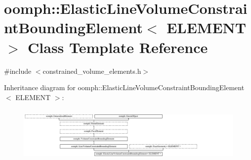 \hypertarget{classoomph_1_1ElasticLineVolumeConstraintBoundingElement}{}\section{oomph\+:\+:Elastic\+Line\+Volume\+Constraint\+Bounding\+Element$<$ E\+L\+E\+M\+E\+NT $>$ Class Template Reference}
\label{classoomph_1_1ElasticLineVolumeConstraintBoundingElement}


{\ttfamily \#include $<$constrained\+\_\+volume\+\_\+elements.\+h$>$}

Inheritance diagram for oomph\+:\+:Elastic\+Line\+Volume\+Constraint\+Bounding\+Element$<$ E\+L\+E\+M\+E\+NT $>$\+:\begin{figure}[H]
\begin{center}
\leavevmode
\includegraphics[height=2.786070cm]{classoomph_1_1ElasticLineVolumeConstraintBoundingElement}
\end{center}
\end{figure}
